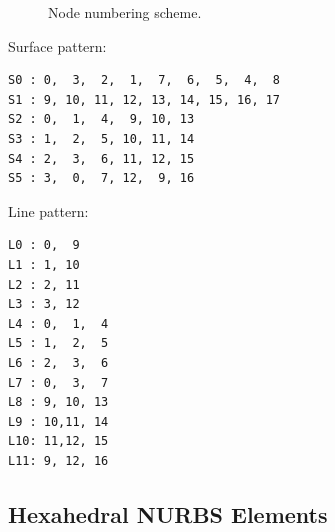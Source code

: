 \begin{figure}[h!]
\begin{center}
\caption{Node numbering scheme.}
\label{fig:conventions:hex18}
\end{center}
\end{figure}

Surface pattern:
\begin{verbatim}
S0 : 0,  3,  2,  1,  7,  6,  5,  4,  8 
S1 : 9, 10, 11, 12, 13, 14, 15, 16, 17 
S2 : 0,  1,  4,  9, 10, 13
S3 : 1,  2,  5, 10, 11, 14
S4 : 2,  3,  6, 11, 12, 15 
S5 : 3,  0,  7, 12,  9, 16 
\end{verbatim}

Line pattern:
\begin{verbatim}
L0 : 0,  9
L1 : 1, 10
L2 : 2, 11 
L3 : 3, 12
L4 : 0,  1,  4
L5 : 1,  2,  5 
L6 : 2,  3,  6
L7 : 0,  3,  7
L8 : 9, 10, 13
L9 : 10,11, 14 
L10: 11,12, 15
L11: 9, 12, 16 
\end{verbatim}


\newpage
\subsection{Hexahedral NURBS Elements}

